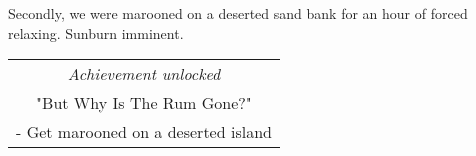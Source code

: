Secondly, we were marooned on a deserted sand bank for an hour of forced relaxing.
Sunburn imminent.

\begin{center}
\begin{tabular}{||c||}
\emph{Achievement unlocked}\\
"But Why Is The Rum Gone?"\\
\multicolumn{1}{||p{0.8\textwidth}||}{\footnotesize - Get marooned on a deserted island} \\
\end{tabular}
\end{center}